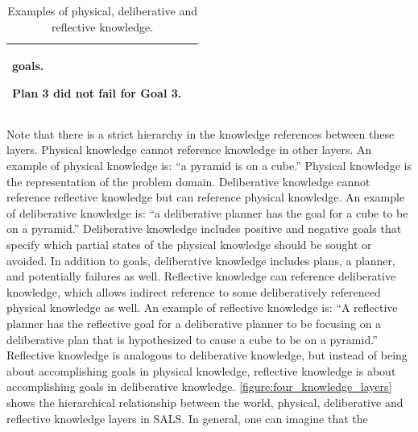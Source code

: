 \begin{table}
\begin{tabular}{|p{2cm}|p{8cm}|}
\begin{packed_itemize}
{  goals.}
\item{Plan 3 did not fail for Goal 3.}
\end{packed_itemize} \\
\hline
\end{tabular}
\caption{Examples of physical, deliberative and reflective knowledge.}
\label{table:physical_deliberative_reflective_knowledge}
\end{table}
Note that there is a strict hierarchy in the knowledge references
between these layers.  Physical knowledge cannot reference knowledge
in other layers.  An example of physical knowledge is: ``a pyramid is
on a cube.''  Physical knowledge is the representation of the problem
domain.  Deliberative knowledge cannot reference reflective knowledge
but can reference physical knowledge.  An example of deliberative
knowledge is: ``a deliberative planner has the goal for a cube to be
on a pyramid.''  Deliberative knowledge includes positive and negative
goals that specify which partial states of the physical knowledge
should be sought or avoided.  In addition to goals, deliberative
knowledge includes plans, a planner, and potentially failures as well.
Reflective knowledge can reference deliberative knowledge, which
allows indirect reference to some deliberatively referenced physical
knowledge as well.  An example of reflective knowledge is: ``A
reflective planner has the reflective goal for a deliberative planner
to be focusing on a deliberative plan that is hypothesized to cause a
cube to be on a pyramid.''  Reflective knowledge is analogous to
deliberative knowledge, but instead of being about accomplishing goals
in physical knowledge, reflective knowledge is about accomplishing
goals in deliberative knowledge.
{\autoref{figure:four_knowledge_layers}} shows the hierarchical
relationship between the world, physical, deliberative and reflective
knowledge layers in SALS.  In general, one can imagine that the
